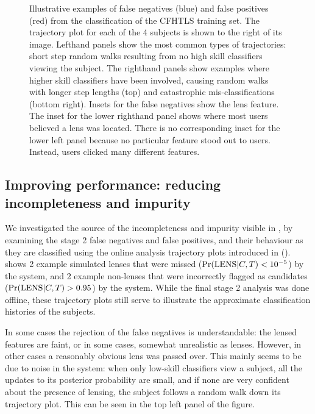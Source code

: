 \documentclass[useAMS,usenatbib,a4paper]{mn2e}
\begin{document}
\begin{figure}
\begin{minipage}{\linewidth}
\begin{minipage}[t]{0.47\linewidth}
\begin{minipage}{0.50\linewidth}
    \end{minipage}
  \end{minipage}
\end{minipage}
\caption{Illustrative examples of 
false negatives (blue) and false positives (red) from the classification of
the \sw CFHTLS training set. The trajectory plot for each of the 4 subjects is
shown to the right of its image. Lefthand panels show the most common types of
trajectories: short step random walks resulting from no high skill classifiers
viewing the subject. The righthand panels show examples where higher skill
classifiers have been involved, causing random walks with longer step lengths
(top) and catastrophic mis-classifications (bottom right). Insets for the false
negatives show the lens feature. The inset for the lower righthand panel shows
where most users believed a lens was located. There is no corresponding inset
for the lower left panel because no particular feature stood out to users.
Instead, users clicked many different features.}
\label{fig:discuss:performance:trajectories}
\end{figure}

\subsection{Improving performance: reducing incompleteness and impurity}
\label{sec:discuss:performance}

We investigated the source of the incompleteness and impurity visible in 
, by examining the stage 2 false negatives and
false positives, and their behaviour as they are classified using the online
analysis trajectory plots introduced in 
().
 shows 2 example simulated lenses 
that were missed (${\rm Pr}({\rm LENS}|C,T) < 10^{-5}$) by the \sw system, and 2 example
non-lenses that were incorrectly flagged as candidates (${\rm Pr}({\rm LENS}|C,T) >
0.95$) by the \sw system. While the final stage 2 analysis was done offline,
these trajectory plots still serve to illustrate the approximate
classification histories of the subjects.

In some cases the rejection of the false negatives is understandable: the
lensed features are faint, or in some cases, somewhat unrealistic as lenses.
However, in other cases a reasonably obvious lens was passed over.  This
mainly seems to be due to noise in the system: when only low-skill classifiers
view a subject, all the updates to its posterior probability are small, and if
none are very confident about the presence of lensing, the subject follows a
random walk down its trajectory plot. This can be seen in the top left panel
of the figure. 
\end{document}
